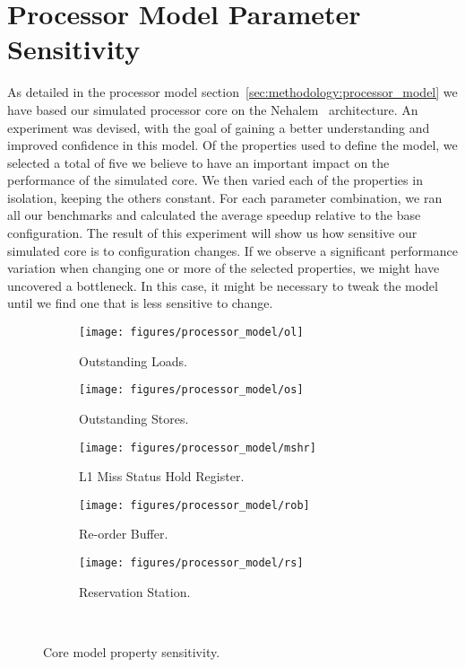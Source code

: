 
\section{Processor Model Parameter Sensitivity}
\label{sec:results:model_sensitivity}

As detailed in the processor model section~\ref{sec:methodology:processor_model} we have based our simulated processor core on the Nehalem~\cite{Thomadakis2011} architecture.
An experiment was devised, with the goal of gaining a better understanding and improved confidence in this model.
Of the properties used to define the model, we selected a total of five we believe to have an important impact on the performance of the simulated core.
We then varied each of the properties in isolation, keeping the others constant.
For each parameter combination, we ran all our benchmarks and calculated the average speedup relative to the base configuration.
The result of this experiment will show us how sensitive our simulated core is to configuration changes.
If we observe a significant performance variation when changing one or more of the selected properties, we might have uncovered a bottleneck.
In this case, it might be necessary to tweak the model until we find one that is less sensitive to change.

\begin{figure}[H]
        \centering
        \begin{subfigure}[b]{0.5\textwidth}
                \texttt{[image: figures/processor\_model/ol]}
                \caption{Outstanding Loads.}
                \label{fig:results:processor_model:ol}
        \end{subfigure}%
        \begin{subfigure}[b]{0.5\textwidth}
                \texttt{[image: figures/processor\_model/os]}
                \caption{Outstanding Stores.}
                \label{fig:results:processor_model:os}
        \end{subfigure}
        \begin{subfigure}[b]{0.5\textwidth}
                \texttt{[image: figures/processor\_model/mshr]}
                \caption{L1 Miss Status Hold Register.}
                \label{fig:results:processor_model:mshr}
        \end{subfigure}%
        \begin{subfigure}[b]{0.5\textwidth}
                \texttt{[image: figures/processor\_model/rob]}
                \caption{Re-order Buffer.}
                \label{fig:results:processor_model:rob}
        \end{subfigure}
        \begin{subfigure}[b]{0.5\textwidth}
                \texttt{[image: figures/processor\_model/rs]}
                \caption{Reservation Station.}
                \label{fig:results:processor_model:rs}
        \end{subfigure}%
        \caption{Core model property sensitivity.}
        \label{fig:results:processor_model}
       ~ %
\end{figure}

